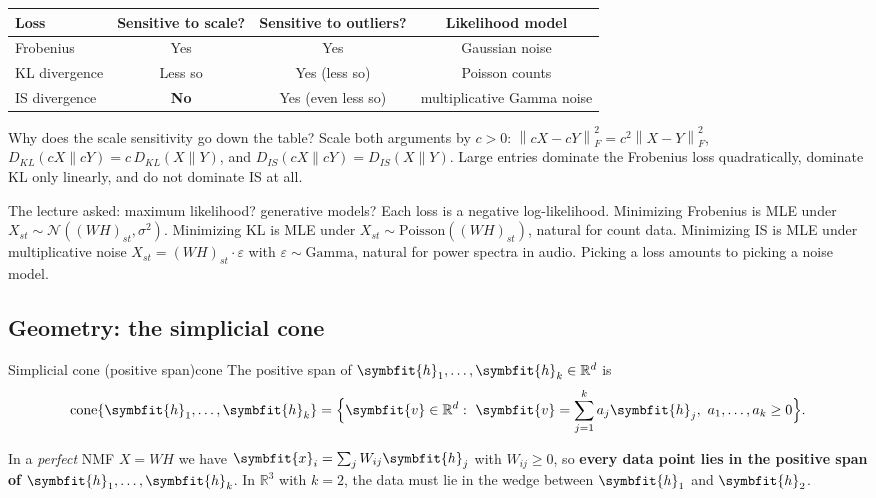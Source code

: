 \documentclass[11pt]{article}
\newcommand{\bm}[1]{\symbfit{#1}}
\newcommand{\R}{\mathbb{R}}
\newcommand{\vx}{\bm{x}}
\newcommand{\vh}{\bm{h}}
\newcommand{\cone}{\operatorname{cone}}
\newcommand{\Fro}[1]{\left\lVert #1\right\rVert_F}
\begin{document}
\begin{center}
\renewcommand{\arraystretch}{1.3}
\begin{tabular}{lccc}
\toprule
Loss & Sensitive to scale? & Sensitive to outliers? & Likelihood model \\
\midrule
Frobenius & Yes & Yes & Gaussian noise \\
KL divergence & Less so & Yes (less so) & Poisson counts \\
IS divergence & \textbf{No} & Yes (even less so) & multiplicative Gamma noise\\
\bottomrule
\end{tabular}
\end{center}

\begin{deeper}
Why does the scale sensitivity go down the table? Scale both arguments by $c>0$:
$\Fro{cX-cY}^2=c^2\Fro{X-Y}^2$, $D_{KL}(cX\|cY)=c\,D_{KL}(X\|Y)$, and
$D_{IS}(cX\|cY)=D_{IS}(X\|Y)$. Large entries dominate the Frobenius loss
quadratically, dominate KL only linearly, and do not dominate IS at all.

The lecture asked: maximum likelihood? generative models? Each loss is a negative
log-likelihood. Minimizing Frobenius is MLE under $X_{st}\sim\mathcal N((WH)_{st},\sigma^2)$.
Minimizing KL is MLE under $X_{st}\sim\text{Poisson}((WH)_{st})$, natural for count data.
Minimizing IS is MLE under multiplicative noise $X_{st}=(WH)_{st}\cdot\varepsilon$ with
$\varepsilon\sim\text{Gamma}$, natural for power spectra in audio. Picking a loss amounts to
picking a noise model.
\end{deeper}

\subsection{Geometry: the simplicial cone}

\begin{definition}{Simplicial cone (positive span)}{cone}
The positive span of $\vh_1,\dots,\vh_k\in\R^d$ is
\[
\cone\{\vh_1,\dots,\vh_k\}=\Big\{\bm v\in\R^d:\ \bm v=\sum_{j=1}^k a_j\vh_j,\ a_1,\dots,a_k\ge0\Big\}.
\]
\end{definition}

In a \emph{perfect} NMF $X=WH$ we have $\vx_i=\sum_j W_{ij}\vh_j$ with $W_{ij}\ge0$, so
\textbf{every data point lies in the positive span of $\vh_1,\dots,\vh_k$}. In $\R^3$
with $k=2$, the data must lie in the wedge between $\vh_1$ and $\vh_2$.
\end{document}
